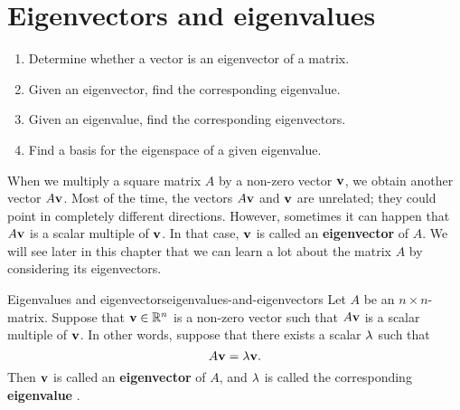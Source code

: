 \section{Eigenvectors and eigenvalues}

\begin{outcome}
  \begin{enumerate}
  \item Determine whether a vector is an eigenvector of a matrix.
  \item Given an eigenvector, find the corresponding eigenvalue.
  \item Given an eigenvalue, find the corresponding eigenvectors.
  \item Find a basis for the eigenspace of a given eigenvalue.
  \end{enumerate}
\end{outcome}

When we multiply a square matrix $A$ by a non-zero vector $\vect{v}$,
we obtain another vector $A\vect{v}$. Most of the time, the vectors
$A\vect{v}$ and $\vect{v}$ are unrelated; they could point in
completely different directions. However, sometimes it can happen that
$A\vect{v}$ is a scalar multiple of $\vect{v}$. In that case,
$\vect{v}$ is called an \textbf{eigenvector} of $A$. We will see later
in this chapter that we can learn a lot about the matrix $A$ by
considering its eigenvectors.

\begin{definition}{Eigenvalues and eigenvectors}{eigenvalues-and-eigenvectors}
  Let $A$ be an $n\times n$-matrix. Suppose that $\vect{v}\in\R^n$ is
  a non-zero vector such that $A\vect{v}$ is a scalar multiple of
  $\vect{v}$. In other words, suppose that there exists a scalar
  $\lambda$ such that
  \begin{equation*}
    A\vect{v}=\eigenvar\vect{v}.
  \end{equation*}
  Then $\vect{v}$ is called an \textbf{eigenvector}%
   of $A$, and $\lambda$ is called the
  corresponding \textbf{eigenvalue}%
  .
\end{definition}

